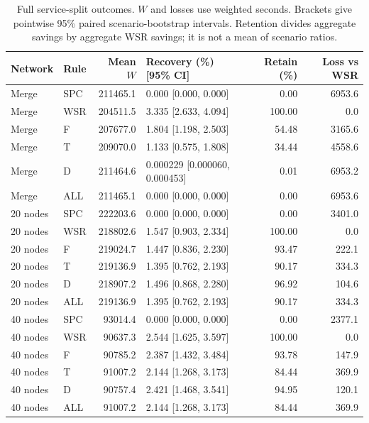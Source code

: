 \begin{table}[!htbp]
\caption{Full service-split outcomes. $W$ and losses use weighted seconds. Brackets give pointwise 95\% paired scenario-bootstrap intervals. Retention divides aggregate savings by aggregate WSR savings; it is not a mean of scenario ratios.}\label{tab:service-split-recovery}
\centering\small
\begin{tabularx}{\textwidth}{l l r L r r}
\toprule Network & Rule & Mean $W$ & Recovery (\%) [95\% CI] & Retain (\%) & Loss vs WSR\\\midrule
Merge & SPC & 211465.1 & 0.000 [0.000, 0.000] & 0.00 & 6953.6\\
Merge & WSR & 204511.5 & 3.335 [2.633, 4.094] & 100.00 & 0.0\\
Merge & F & 207677.0 & 1.804 [1.198, 2.503] & 54.48 & 3165.6\\
Merge & T & 209070.0 & 1.133 [0.575, 1.808] & 34.44 & 4558.6\\
Merge & D & 211464.6 & 0.000229 [0.000060, 0.000453] & 0.01 & 6953.2\\
Merge & ALL & 211465.1 & 0.000 [0.000, 0.000] & 0.00 & 6953.6\\
20 nodes & SPC & 222203.6 & 0.000 [0.000, 0.000] & 0.00 & 3401.0\\
20 nodes & WSR & 218802.6 & 1.547 [0.903, 2.334] & 100.00 & 0.0\\
20 nodes & F & 219024.7 & 1.447 [0.836, 2.230] & 93.47 & 222.1\\
20 nodes & T & 219136.9 & 1.395 [0.762, 2.193] & 90.17 & 334.3\\
20 nodes & D & 218907.2 & 1.496 [0.868, 2.280] & 96.92 & 104.6\\
20 nodes & ALL & 219136.9 & 1.395 [0.762, 2.193] & 90.17 & 334.3\\
40 nodes & SPC & 93014.4 & 0.000 [0.000, 0.000] & 0.00 & 2377.1\\
40 nodes & WSR & 90637.3 & 2.544 [1.625, 3.597] & 100.00 & 0.0\\
40 nodes & F & 90785.2 & 2.387 [1.432, 3.484] & 93.78 & 147.9\\
40 nodes & T & 91007.2 & 2.144 [1.268, 3.173] & 84.44 & 369.9\\
40 nodes & D & 90757.4 & 2.421 [1.468, 3.541] & 94.95 & 120.1\\
40 nodes & ALL & 91007.2 & 2.144 [1.268, 3.173] & 84.44 & 369.9\\
\bottomrule
\end{tabularx}
\end{table}
